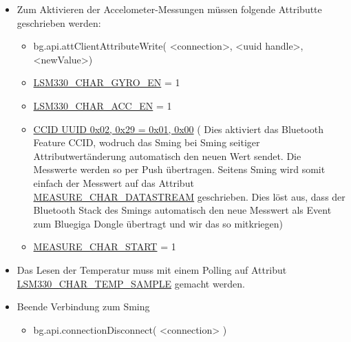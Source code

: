 \begin{itemize}
	
	\item Zum Aktivieren der Accelometer-Messungen müssen folgende Attributte geschrieben werden:
	\begin{itemize}
		\itemsep 1pt \parskip 0pt \parsep 0pt
		\item bg.api.attClientAttributeWrite( <connection>, <uuid handle>, <newValue>)
		\item \url{LSM330_CHAR_GYRO_EN} = 1 
		\item \url{LSM330_CHAR_ACC_EN} = 1 
		\item \url{CCID UUID 0x02, 0x29 = 0x01, 0x00} ( Dies aktiviert das Bluetooth Feature CCID, wodruch das Sming bei Sming seitiger Attributwertänderung automatisch den neuen Wert sendet. Die Messwerte werden so per Push übertragen. Seitens Sming wird somit einfach der Messwert auf das Attribut \url{MEASURE_CHAR_DATASTREAM} geschrieben. Dies löst aus, dass der Bluetooth Stack des Smings automatisch den neue Messwert als Event zum Bluegiga Dongle übertragt und wir das so mitkriegen)
		\item \url{MEASURE_CHAR_START} = 1
	\end{itemize}
	
	
	\item Das Lesen der Temperatur muss mit einem Polling auf Attribut \url{LSM330_CHAR_TEMP_SAMPLE} gemacht werden.
	
	\item Beende Verbindung zum Sming
	\begin{itemize}
		\itemsep 1pt \parskip 0pt \parsep 0pt
		\item bg.api.connectionDisconnect( <connection> )
	\end{itemize}
\end{itemize}

